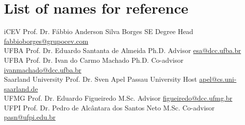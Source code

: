 \documentclass[nocolors]{friggeri-cv-a4}
\begin{document}
\section{List of names for reference}
\vspace{2cm}
\begin{entrylist}
	\entry
	{iCEV}
	{Prof. Dr. Fábbio Anderson Silva Borges}
	{SE Degree Head}
	{\href{mailto:fabbioborges@grupocev.com}{fabbioborges@grupocev.com}}\\
	
	\entry
	{UFBA}
	{Prof. Dr. Eduardo Santanta de Almeida}
	{Ph.D. Advisor}
	{\href{mailto:esa@dcc.ufba.br}{esa@dcc.ufba.br}}\\
	
	\entry
	{UFBA}
	{Prof. Dr. Ivan do Carmo Machado}
	{Ph.D. Co-advisor}
	{\href{mailto:ivanmachado@dcc.ufba.br}{ivanmachado@dcc.ufba.br}}\\
	
	\entry
	{Saarland University}
	{Prof. Dr. Sven Apel}
	{Passau University Host}
	{\href{mailto:apel@cs.uni-saarland.de}{apel@cs.uni-saarland.de}}\\
	
	\entry
	{UFMG}
	{Prof. Dr. Eduardo Figueiredo}
	{M.Sc. Advisor}
	{\href{mailto:figueiredo@dcc.ufmg.br}{figueiredo@dcc.ufmg.br}}\\
	
	\entry
	{UFPI}
	{Prof. Dr. Pedro de Alcântara dos Santos Neto}
	{M.Sc. Co-advisor}
	{\href{mailto:pasn@ufpi.edu.br}{pasn@ufpi.edu.br}}\\		
	
	
\end{entrylist}
\end{document}
